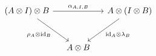 \documentclass[border=6pt]{standalone}
\newcommand{\id}{\mathrm{id}}
\begin{document}
$
\begin{tikzcd}[column sep=small, row sep=large]
  (A \otimes I) \otimes B \arrow[rr, "\alpha_{A,I,B}"] \arrow[dr, "\rho_A \otimes \id_B"'] & & A \otimes (I \otimes B) \arrow[dl, "\id_A \otimes \lambda_B"] \\
  & A \otimes B &
\end{tikzcd}
$
\end{document}
